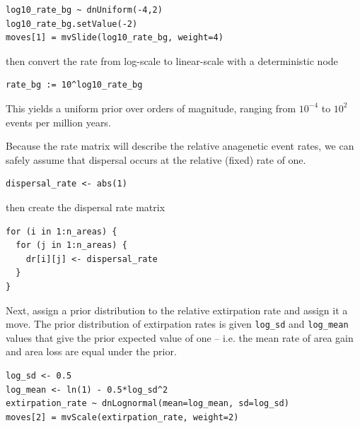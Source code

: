 \begin{snugshade}
\begin{lstlisting}
log10_rate_bg ~ dnUniform(-4,2)
log10_rate_bg.setValue(-2)
moves[1] = mvSlide(log10_rate_bg, weight=4)
\end{lstlisting}
\end{snugshade}

then convert the rate from log-scale to linear-scale with a deterministic node

\begin{snugshade}
\begin{lstlisting}
rate_bg := 10^log10_rate_bg
\end{lstlisting}
\end{snugshade}

This yields a uniform prior over orders of magnitude, ranging from $10^{-4}$ to $10^2$ events per million years.

Because the rate matrix will describe the relative anagenetic event rates, we can safely assume that dispersal occurs at the relative (fixed) rate of one.

\begin{snugshade}
\begin{lstlisting}
dispersal_rate <- abs(1)
\end{lstlisting}
\end{snugshade}

then create the dispersal rate matrix

\begin{snugshade}
\begin{lstlisting}
for (i in 1:n_areas) {
  for (j in 1:n_areas) {
    dr[i][j] <- dispersal_rate
  }
}
\end{lstlisting}
\end{snugshade}

Next, assign a prior distribution to the relative extirpation rate and assign it a move.
The prior distribution of extirpation rates is given {\tt log\_sd} and {\tt log\_mean} values that give the prior expected value of one -- i.e. the mean rate of area gain and area loss are equal under the prior.

\begin{snugshade}
\begin{lstlisting}
log_sd <- 0.5
log_mean <- ln(1) - 0.5*log_sd^2
extirpation_rate ~ dnLognormal(mean=log_mean, sd=log_sd)
moves[2] = mvScale(extirpation_rate, weight=2)
\end{lstlisting}
\end{snugshade}

